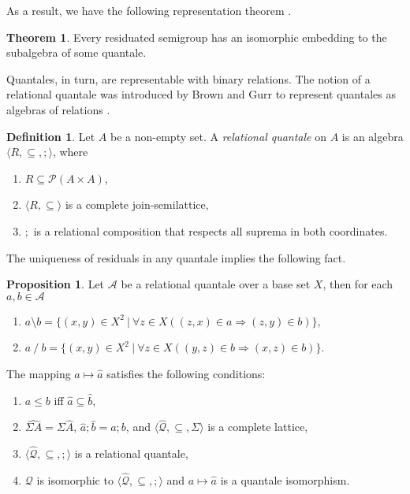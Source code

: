 \documentclass[a4paper]{article}
\theoremstyle{definition}
\newtheorem{definition}{Definition}
\theoremstyle{theorem}
\newtheorem{theorem}{Theorem}
\theoremstyle{proposition}
\newtheorem{proposition}{Proposition}
\theoremstyle{lemma}
\theoremstyle{ex}
\theoremstyle{corollary}
\theoremstyle{claim}
\begin{document}
As a result, we have the following representation theorem \cite[Corollary 2]{goldblatt2006kripke}.

\begin{theorem} \label{orsRep}
  Every residuated semigroup has an isomorphic embedding to the subalgebra of some quantale.
\end{theorem}

Quantales, in turn, are representable with binary relations. The notion of a relational quantale was introduced by Brown and Gurr to represent quantales as algebras of relations \cite{brown1993representation}.
\begin{definition}
  Let $A$ be a non-empty set. A \emph{relational quantale} on $A$ is an algebra $\langle R, \subseteq, ; \rangle$, where
  \begin{enumerate}
    \item $R \subseteq \mathcal{P}(A \times A)$,
    \item $\langle R, \subseteq \rangle$ is a complete join-semilattice,
    \item $;$ is a relational composition that respects all suprema in both coordinates.
  \end{enumerate}
\end{definition}

The uniqueness of residuals in any quantale implies the following fact.
\begin{proposition}\label{ok}
  Let $\mathcal{A}$ be a relational quantale over a base set $X$, then for each $a, b \in \mathcal{A}$
  \begin{enumerate}
    \item $a \setminus b = \{ (x, y) \in X^2 \: | \: \forall z \in X ( (z, x) \in a \Rightarrow (z, y) \in b) \}$,
    \item $a \: / \: b = \{ (x, y) \in X^2 \: | \: \forall z \in X ( (y, z) \in b \Rightarrow (x, z) \in b )\}$.
  \end{enumerate}
\end{proposition}

The mapping $a \mapsto \hat{a}$ satisfies the following conditions:

\begin{enumerate}
\item $a \leq b$ iff $\hat{a} \subseteq \hat{b}$,

\item $\widehat{\Sigma A} = \Sigma \widehat{A}$, $\hat{a} ; \hat{b} = \widehat{a ; b}$, and $\langle \widehat{\mathcal{Q}}, \subseteq, \Sigma \rangle$ is a complete lattice,

\item $\langle \widehat{\mathcal{Q}}, \subseteq, ; \rangle$ is a relational quantale,

\item $\mathcal{Q}$ is isomorphic to $\langle \widehat{\mathcal{Q}}, \subseteq, ; \rangle$ and $a \mapsto \hat{a}$ is a quantale isomorphism.
\end{enumerate}
\end{document}
